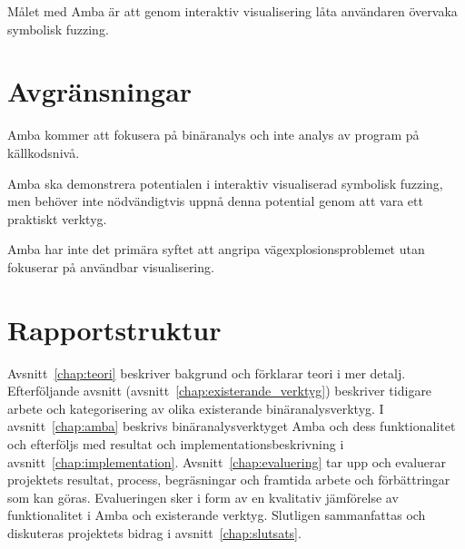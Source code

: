 Målet med Amba är att genom interaktiv visualisering låta användaren övervaka
symbolisk fuzzing.

\section{Avgränsningar}

Amba kommer att fokusera på binäranalys och inte analys av program på
källkodsnivå.

Amba ska demonstrera potentialen i interaktiv visualiserad symbolisk fuzzing,
men behöver inte nödvändigtvis uppnå denna potential genom att vara ett
praktiskt verktyg.

Amba har inte det primära syftet att angripa vägexplosionsproblemet utan
fokuserar på användbar visualisering.

\section{Rapportstruktur}

Avsnitt~\ref{chap:teori} beskriver bakgrund och förklarar teori i mer detalj.
Efterföljande avsnitt (avsnitt~\ref{chap:existerande_verktyg}) beskriver
tidigare arbete och kategorisering av olika existerande binäranalysverktyg. I
avsnitt~\ref{chap:amba} beskrivs binäranalysverktyget Amba och dess
funktionalitet och efterföljs med resultat och implementationsbeskrivning i
avsnitt~\ref{chap:implementation}. Avsnitt~\ref{chap:evaluering} tar upp och
evaluerar projektets resultat, process, begräsningar och framtida arbete och
förbättringar som kan göras. Evalueringen sker i form av en kvalitativ
jämförelse av funktionalitet i Amba och existerande verktyg. Slutligen
sammanfattas och diskuteras projektets bidrag i avsnitt~\ref{chap:slutsats}.
